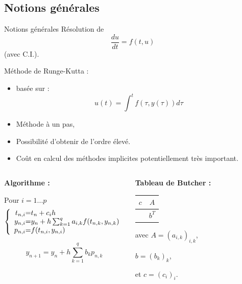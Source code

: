 \documentclass[11pt]{beamer}
\begin{document}
\subsection{Notions générales}
\begin{frame}{Notions générales}
Résolution de $$\dfrac{du}{dt} = f(t,u)$$ (avec C.I.).

\begin{block}{}
Méthode de Runge-Kutta :
\begin{itemize}
\item basée sur :
$$u(t) = \int^t f(\tau,y(\tau))d\tau$$
\item Méthode à un pas,
\item Possibilité d'obtenir de l'ordre élevé.
\item Co\^ut en calcul des méthodes implicites potentiellement très important.
\end{itemize}
\end{block}

\end{frame}

\begin{frame}
\begin{columns}
\begin{block}{\textbf{Algorithme :}}

Pour $i=1...p$
\[
\left \{
\begin{array}{r @{=} l}
    t_{n,i} & t_n + c_i h \\
    y_{n,i} & y_n + h \sum_{k=1}^q a_{i,k}f(t_{n,k} , y_{n,k}) \\
    p_{n,i} & f( t_{n,i} , y_{n,i} )
\end{array}
\right.
\]

$$y_{n+1} = y_n + h \sum_{k=1}^q b_k p_{n,k}$$
\end{block}

\pause
{}
\begin{block}{\textbf{Tableau de Butcher :}}

\begin{tabular}{c|c}
$c$ & $A$\\
\hline
    & $b^T$
\end{tabular}

avec $A=(a_{i,k})_{i,k}$,

$b=(b_k)_k$,

et $c=(c_i)_i$.
\end{block}
\end{columns}

\end{frame}
\end{document}
